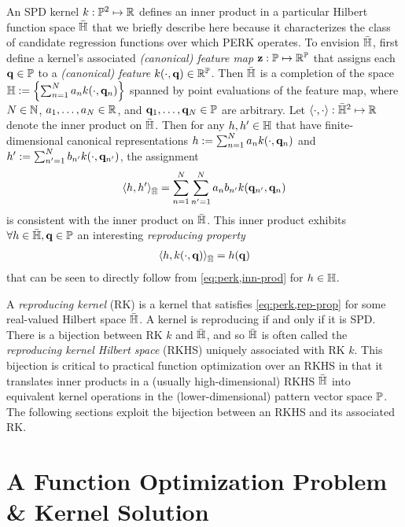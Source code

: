 An SPD kernel $k : \mathbb{P}^2 \mapsto \mathbb{R}$
defines an inner product 
in a particular Hilbert function space ${\bar{\mathbb{H}}}$
that we briefly describe here
because it characterizes
the class of candidate regression functions
over which PERK operates.
To envision ${\bar{\mathbb{H}}}$,
first define a kernel's associated \emph{(canonical) feature map} 
$\mathbf{z} : \mathbb{P} \mapsto \mathbb{R}^{\mathbb{P}}$
that assigns each $\mathbf{q} \in \mathbb{P}$ 
to a \emph{(canonical) feature} $k\paren{\cdot,\bmq} \in \reals{\setQ}$.
Then ${\bar{\mathbb{H}}}$ is a completion 
of the space $\setH := \set{\sum_{n=1}^N a_n k\paren{\cdot,\bmq_n}}$
spanned by point evaluations
of the feature map,
where
$N \in \mathbb{N}$,
$a_1,\dots,a_N \in \mathbb{R}$,
and
$\mathbf{q}_1,\dots,\mathbf{q}_N \in \mathbb{P}$ are arbitrary.
Let $\langle \cdot,\cdot \rangle : {\bar{\mathbb{H}}}^2 \mapsto \mathbb{R}$ 
denote the inner product on ${\bar{\mathbb{H}}}$.
Then for any $h,h' \in \mathbb{H}$
that have finite-dimensional canonical representations
$h := \sum_{n=1}^N a_n k\paren{\cdot,\bmq_n}$ 
and
$h' := \sum_{n'=1}^N b_{n'} k\paren{\cdot,\bmq_{n'}}$,
the assignment
\begin{align}
	\innprod{h}{h'}_\rkhs =
		\sum_{n=1}^N \sum_{n'=1}^N a_n b_{n'} k\paren{\bmq_{n'},\bmq_n}
	\label{eq:perk,inn-prod}
\end{align}
is consistent
with the inner product on ${\bar{\mathbb{H}}}$.
This inner product exhibits $\forall h\in{\bar{\mathbb{H}}}, \mathbf{q}\in\mathbb{P}$
an interesting \emph{reproducing property}
\begin{align}
	\innprod{h}{k\paren{\cdot,\bmq}}_\rkhs = h\paren{\bmq}
	\label{eq:perk,rep-prop}
\end{align}
that can be seen to directly follow 
from \eqref{eq:perk,inn-prod}
for $h \in \mathbb{H}$.

A \emph{reproducing kernel} (RK) is a kernel 
that satisfies \eqref{eq:perk,rep-prop}
for some real-valued Hilbert space ${\bar{\mathbb{H}}}$.
A kernel is reproducing if and only if it is SPD.
There is a bijection between RK $k$ and ${\bar{\mathbb{H}}}$,
and so ${\bar{\mathbb{H}}}$ is often called
the \emph{reproducing kernel Hilbert space} (RKHS)
uniquely associated with RK $k$.
This bijection is critical
to practical function optimization over an RKHS
in that it translates inner products 
in a (usually high-dimensional) RKHS ${\bar{\mathbb{H}}}$
into equivalent kernel operations 
in the (lower-dimensional) pattern vector space $\mathbb{P}$.
The following sections exploit 
the bijection between an RKHS 
and its associated RK.

\section{A Function Optimization Problem \& Kernel Solution}
\label{s,perk,meth}

